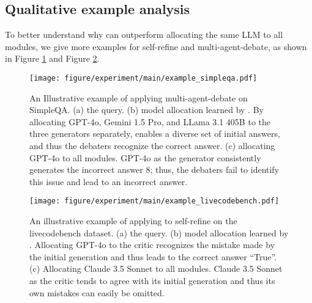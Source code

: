 \subsection{Qualitative example analysis}
To better understand why \deluxesystem{} can outperform allocating the same LLM to all modules, we give more examples for self-refine and multi-agent-debate, as shown in Figure \ref{fig:deluxeagent:examples_simpleqa} and Figure \ref{fig:deluxeagent:example_livecodebench}.

\begin{figure}[!ht]
    \centering
    \texttt{[image: figure/experiment/main/example\_simpleqa.pdf]}
    \caption{An Illustrative example of applying \deluxesystem{} multi-agent-debate on SimpleQA. (a) the query. (b) model allocation learned by \deluxesystem{}. By allocating GPT-4o, Gemini 1.5 Pro, and LLama 3.1 405B to the three generators separately, \deluxesystem{} enables a diverse set of initial answers, and thus the debaters recognize the correct answer. (c) allocating GPT-4o to all modules. GPT-4o as the generator consistently generates the incorrect answer 8; thus, the debaters fail to identify this issue and lead to an incorrect answer. }
    \label{fig:deluxeagent:examples_simpleqa}
\end{figure}



\begin{figure}[!ht]
    \centering
    \texttt{[image: figure/experiment/main/example\_livecodebench.pdf]}
    \caption{An illustrative example of applying \deluxesystem{} to self-refine on the livecodebench dataset. (a) the query. (b) model allocation learned by \deluxesystem{}. Allocating GPT-4o to the critic recognizes the mistake made by the initial generation and thus leads to the correct answer ``True''. (c) Allocating Claude 3.5 Sonnet to all modules. Claude 3.5 Sonnet as the critic tends to agree with its initial generation and thus its own mistakes can easily be omitted. }
    \label{fig:deluxeagent:example_livecodebench}
\end{figure}



